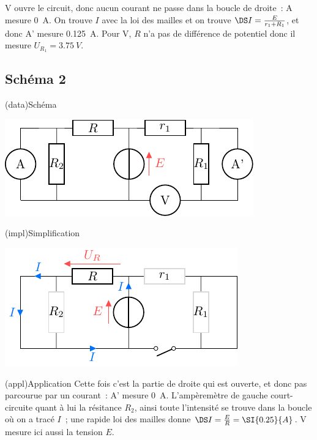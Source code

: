\documentclass[../../main/main.tex]{subfiles}
\begin{document}
{\begin{tcbraster}[raster columns=3, raster equal height=rows]
\begin{tcb}
        V ouvre le circuit, donc aucun courant ne passe dans la boucle de
        droite~: A mesure \SI{0}{A}. On trouve $I$ avec la loi des mailles et on
        trouve $\DS I = \frac{E}{r_1 + R_1}$, et donc A' mesure \SI{0.125}{A}.
        Pour V, $R$ n'a pas de différence de potentiel donc il mesure $U_{R_1}
        = \SI{3.75}{V}$.

    \end{tcb}
\end{tcbraster}
\subsection{Schéma 2}
\begin{tcbraster}[raster columns=2, raster equal height=rows]
    \begin{tcb}(data){Schéma}
        \begin{center}
            \includegraphics{mes_iu_b}
        \end{center}
    \end{tcb}
    \begin{tcb}(impl){Simplification}
        \begin{center}
           \includegraphics{mes_iu_b-simple}
        \end{center} 
    \end{tcb}
\end{tcbraster}
\begin{center}
    \begin{tcb}[width=\linewidth](appl){Application}
        Cette fois c'est la partie de droite qui est ouverte, et donc pas
        parcourue par un courant~: A' mesure \SI{0}{A}. L'ampèremètre de gauche
        court-circuite quant à lui la résitance $R_2$, ainsi toute l'intensité
        se trouve dans la boucle où on a tracé \textcolor{brandeisblue}{$I$}~;
        une rapide loi des mailles donne $\DS I = \frac{E}{R} = \SI{0.25}{A}$. V
        mesure ici aussi la tension $E$.
    \end{tcb}
\end{center}
}
\end{document}
